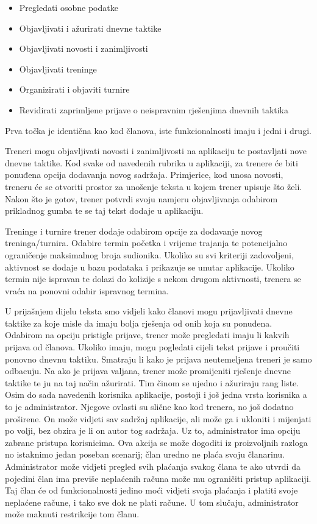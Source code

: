 \documentclass{article}
\begin{document}
		\begin{itemize}
			\item Pregledati osobne podatke 
			\item Objavljivati i ažurirati dnevne taktike 
			\item Objavljivati novosti i zanimljivosti 
			\item Objavljivati treninge 
			\item Organizirati i objaviti turnire 
			\item Revidirati zaprimljene prijave o neispravnim rješenjima dnevnih taktika 
		\end{itemize} 
		
		Prva točka je identična kao kod članova, iste funkcionalnosti imaju i jedni i drugi. 
		
		Treneri mogu objavljivati novosti i zanimljivosti na aplikaciju te postavljati nove dnevne taktike. Kod svake od navedenih rubrika u aplikaciji, za trenere će biti ponuđena opcija dodavanja novog sadržaja. Primjerice, kod unosa novosti, treneru će se otvoriti prostor za unošenje teksta u kojem trener upisuje što želi. Nakon što je gotov, trener potvrdi svoju namjeru objavljivanja odabirom prikladnog gumba te se taj tekst dodaje u aplikaciju. 
		
		Treninge i turnire trener dodaje odabirom opcije za dodavanje novog treninga/turnira. Odabire termin početka i vrijeme trajanja te potencijalno ograničenje maksimalnog broja sudionika. Ukoliko su svi kriteriji zadovoljeni, aktivnost se dodaje u bazu podataka i prikazuje se unutar aplikacije. Ukoliko termin nije ispravan te dolazi do kolizije s nekom drugom aktivnosti, trenera se vraća na ponovni odabir ispravnog termina. 
		
		U prijašnjem dijelu teksta smo vidjeli kako članovi mogu prijavljivati dnevne taktike za koje misle da imaju bolja rješenja od onih koja su ponuđena. Odabirom na opciju pristigle prijave, trener može pregledati imaju li kakvih prijava od članova. Ukoliko imaju, mogu pogledati cijeli tekst prijave i proučiti ponovno dnevnu taktiku. Smatraju li kako je prijava neutemeljena treneri je samo odbacuju. Na ako je prijava valjana, trener može promijeniti rješenje dnevne taktike te ju na taj način ažurirati. Tim činom se ujedno i ažuriraju rang liste.\\ 
		
		
		Osim do sada navedenih korisnika aplikacije, postoji i još jedna vrsta korisnika a to je administrator. Njegove ovlasti su slične kao kod trenera, no još dodatno proširene. On može vidjeti sav sadržaj aplikacije, ali može ga i ukloniti i mijenjati po volji, bez obzira je li on autor tog sadržaja. Uz to, administrator ima opciju zabrane pristupa korisnicima. Ova akcija se može dogoditi iz proizvoljnih razloga no istaknimo jedan poseban scenarij; član uredno ne plaća svoju članarinu. Administrator može vidjeti pregled svih plaćanja svakog člana te ako utvrdi da pojedini član ima previše neplaćenih računa može mu ograničiti pristup aplikaciji. Taj član će od funkcionalnosti jedino moći vidjeti svoja plaćanja i platiti svoje neplaćene račune, i tako sve dok ne plati račune. U tom slučaju, administrator može maknuti restrikcije tom članu.
		\eject 
		
\end{document}
